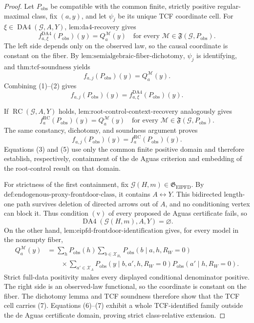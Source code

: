 \documentclass{article}
\begin{document}
\begin{proof}
Let \(P_{\mathrm{obs}}\) be compatible with the common finite, strictly positive regular-maximal class, fix \((a,y)\), and let \(\psi_j\) be its unique TCF coordinate cell.  For \(\xi\in\operatorname{DA4}(\mathcal G,A,Y)\), \(\text{lem:da4-recovery}\) gives
\[
f^{\mathrm{DA4}}_{a,\xi}(P_{\mathrm{obs}})(y)
=Q_a^{\mathcal M}(y)
\quad\text{for every }\mathcal M\in\mathfrak F(\mathcal G,P_{\mathrm{obs}}).
\tag{1}
\]
The left side depends only on the observed law, so the causal coordinate is constant on the fiber.  By \(\text{lem:semialgebraic-fiber-dichotomy}\), \(\psi_j\) is identifying, and \(\text{thm:tcf-soundness}\) yields
\[
f_{a,j}(P_{\mathrm{obs}})(y)=Q_a^{\mathcal M}(y).
\tag{2}
\]
Combining (1)--(2) gives
\[
f_{a,j}(P_{\mathrm{obs}})(y)
=f^{\mathrm{DA4}}_{a,\xi}(P_{\mathrm{obs}})(y).
\tag{3}
\]

If \(\operatorname{RC}(\mathcal G,A,Y)\) holds, \(\text{lem:root-control-context-recovery}\) analogously gives
\[
f_a^{\mathrm{RC}}(P_{\mathrm{obs}})(y)
=Q_a^{\mathcal M}(y)
\quad\text{for every }\mathcal M\in\mathfrak F(\mathcal G,P_{\mathrm{obs}}).
\tag{4}
\]
The same constancy, dichotomy, and soundness argument proves
\[
f_{a,j}(P_{\mathrm{obs}})(y)=f_a^{\mathrm{RC}}(P_{\mathrm{obs}})(y).
\tag{5}
\]
Equations (3) and (5) use only the common finite positive domain and therefore establish, respectively, containment of the de Aguas criterion and embedding of the root-control result on that domain.

For strictness of the first containment, fix \(\mathcal G(H,m)\in\mathfrak G_{\mathrm{EIPFD}}\).  By \(\text{def:endogenous-proxy-frontdoor-class}\), it contains \(A\leftrightarrow Y\).  This bidirected length-one path survives deletion of directed arrows out of \(A\), and no conditioning vertex can block it.  Thus condition \(\mathrm{(v)}\) of every proposed de Aguas certificate fails, so
\[
\operatorname{DA4}(\mathcal G(H,m),A,Y)=\varnothing.
\tag{6}
\]
On the other hand, \(\text{lem:eipfd-frontdoor-identification}\) gives, for every model in the nonempty fiber,
\[
\begin{aligned}
Q_a^{\mathcal M}(y)
&=\sum_hP_{\mathrm{obs}}(h)
\sum_{b\in\mathcal X_{B_1}}P_{\mathrm{obs}}(b\mid a,h,R_W=0)\\
&\qquad\times\sum_{a'\in\mathcal X_A}
P_{\mathrm{obs}}(y\mid b,a',h,R_W=0)
P_{\mathrm{obs}}(a'\mid h,R_W=0).
\end{aligned}
\tag{7}
\]
Strict full-data positivity makes every displayed conditional denominator positive.  The right side is an observed-law functional, so the coordinate is constant on the fiber.  The dichotomy lemma and TCF soundness therefore show that the TCF cell carries (7).  Equations (6)--(7) exhibit a whole TCF-identified family outside the de Aguas certificate domain, proving strict class-relative extension.


\end{proof}
\end{document}

